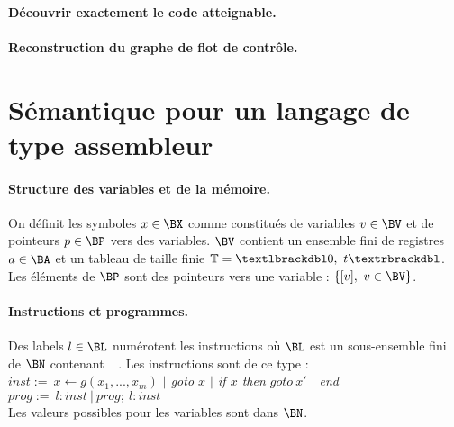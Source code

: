 
\paragraph{Découvrir exactement le code atteignable.}

\paragraph{Reconstruction du graphe de flot de contrôle.}


\section{Sémantique pour un langage de type assembleur}

\paragraph{Structure des variables et de la mémoire.}

\begin{defi}
On définit les symboles $x\in\BX$ comme constitués de variables $v\in\BV$ et de pointeurs $p\in\BP$ vers des variables. $\BV$ contient un ensemble fini de registres $a\in\BA$ et un tableau de taille finie $\mathbb{T}=\textlbrackdbl 0,\ t\textrbrackdbl$. Les éléments de $\BP$ sont des pointeurs vers une variable : $\{[v],\ v\in \BV\}$.
\end{defi}


\paragraph{Instructions et programmes.}
\begin{defi}
Des labels $l\in\BL$ numérotent les instructions où $\BL$ est un sous-ensemble fini de $\BN$ contenant $\bot$. Les instructions sont de ce type : \\
$inst:=\ $\emph{$x\leftarrow g(x_1, ..., x_m)$ $|$ goto $x$ $|$ if $x$ then $goto\ x'$ $|$ end}\\
$prog:=\ $\emph{$l:inst\ |\ prog;\ l:inst$}\\
Les valeurs possibles pour les variables sont dans $\BN$.
\end{defi}

